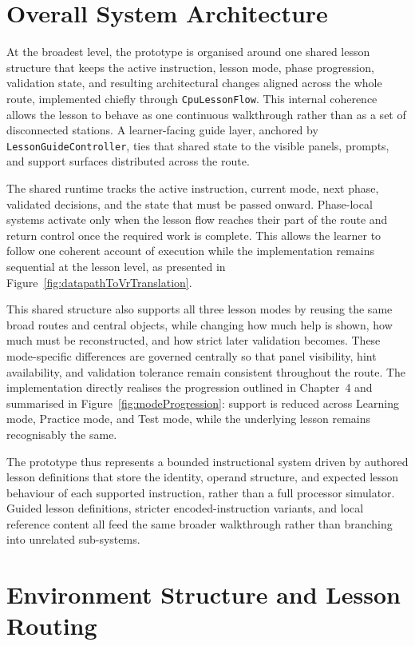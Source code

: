 \section{Overall System Architecture}

At the broadest level, the prototype is organised around one shared lesson structure that keeps the active instruction, lesson mode, phase progression, validation state, and resulting architectural changes aligned across the whole route, implemented chiefly through \texttt{CpuLessonFlow}. This internal coherence allows the lesson to behave as one continuous walkthrough rather than as a set of disconnected stations. A learner-facing guide layer, anchored by \texttt{LessonGuideController}, ties that shared state to the visible panels, prompts, and support surfaces distributed across the route.

The shared runtime tracks the active instruction, current mode, next phase, validated decisions, and the state that must be passed onward. Phase-local systems activate only when the lesson flow reaches their part of the route and return control once the required work is complete. This allows the learner to follow one coherent account of execution while the implementation remains sequential at the lesson level, as presented in Figure~\ref{fig:datapathToVrTranslation}.

This shared structure also supports all three lesson modes by reusing the same broad routes and central objects, while changing how much help is shown, how much must be reconstructed, and how strict later validation becomes. These mode-specific differences are governed centrally so that panel visibility, hint availability, and validation tolerance remain consistent throughout the route. The implementation directly realises the progression outlined in Chapter~4 and summarised in Figure~\ref{fig:modeProgression}: support is reduced across Learning mode, Practice mode, and Test mode, while the underlying lesson remains recognisably the same.

The prototype thus represents a bounded instructional system driven by authored lesson definitions that store the identity, operand structure, and expected lesson behaviour of each supported instruction, rather than a full processor simulator. Guided lesson definitions, stricter encoded-instruction variants, and local reference content all feed the same broader walkthrough rather than branching into unrelated sub-systems.

\section{Environment Structure and Lesson Routing}

